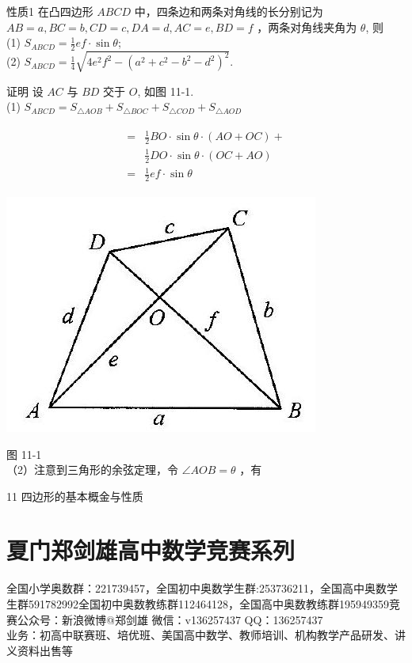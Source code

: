 \documentclass[10pt]{article}
\begin{document}
性质1 在凸四边形 $A B C D$ 中，四条边和两条对角线的长分别记为 $A B=a, B C=b, C D=c, D A=d, A C=e, B D=f$ ，两条对角线夹角为 $\theta$, 则\\
(1) $S_{A B C D}=\frac{1}{2} e f \cdot \sin \theta$;\\
(2) $S_{A B C D}=\frac{1}{4} \sqrt{4 e^{2} f^{2}-\left(a^{2}+c^{2}-b^{2}-d^{2}\right)^{2}}$.

证明 设 $A C$ 与 $B D$ 交于 $O$, 如图 11-1.\\
(1) $S_{A B C D}=S_{\triangle A O B}+S_{\triangle B O C}+S_{\triangle C O D}+S_{\triangle A O D}$

\begin{align*}
\begin{aligned}
= & \frac{1}{2} B O \cdot \sin \theta \cdot(A O+O C)+ \\
& \frac{1}{2} D O \cdot \sin \theta \cdot(O C+A O) \\
= & \frac{1}{2} e f \cdot \sin \theta
\end{aligned}
\end{align*}

\begin{center}
\includegraphics[max width=\textwidth]{2024_10_30_2c8f45efd4a519b08e1ag-101}
\end{center}

图 11-1\\
（2）注意到三角形的余弦定理，令 $\angle A O B=\theta$ ，有

11 四边形的基本概金与性质

\section*{夏门郑剑雄高中数学竞赛系列}
全国小学奥数群：221739457，全国初中奥数学生群:253736211，全国高中奥数学生群591782992全国初中奥数教练群112464128，全国高中奥数教练群195949359竞赛公众号：新浪微博@郑剑雄 微信：v136257437 QQ：136257437\\
业务：初高中联赛班、培优班、美国高中数学、教师培训、机构教学产品研发、讲义资料出售等
\end{document}
